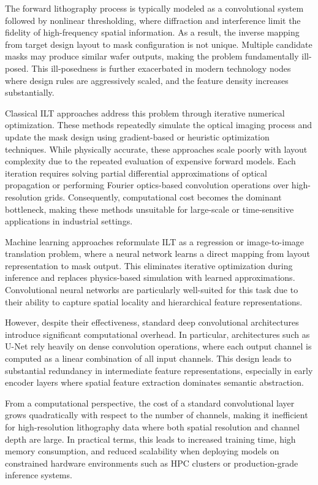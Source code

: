 \documentclass[conference]{IEEEtran}
\begin{document}
The forward lithography process is typically modeled as a convolutional system followed by nonlinear thresholding, where diffraction and interference limit the fidelity of high-frequency spatial information. As a result, the inverse mapping from target design layout to mask configuration is not unique. Multiple candidate masks may produce similar wafer outputs, making the problem fundamentally ill-posed. This ill-posedness is further exacerbated in modern technology nodes where design rules are aggressively scaled, and the feature density increases substantially.

Classical ILT approaches address this problem through iterative numerical optimization. These methods repeatedly simulate the optical imaging process and update the mask design using gradient-based or heuristic optimization techniques. While physically accurate, these approaches scale poorly with layout complexity due to the repeated evaluation of expensive forward models. Each iteration requires solving partial differential approximations of optical propagation or performing Fourier optics-based convolution operations over high-resolution grids. Consequently, computational cost becomes the dominant bottleneck, making these methods unsuitable for large-scale or time-sensitive applications in industrial settings.

Machine learning approaches reformulate ILT as a regression or image-to-image translation problem, where a neural network learns a direct mapping from layout representation to mask output. This eliminates iterative optimization during inference and replaces physics-based simulation with learned approximations. Convolutional neural networks are particularly well-suited for this task due to their ability to capture spatial locality and hierarchical feature representations.

However, despite their effectiveness, standard deep convolutional architectures introduce significant computational overhead. In particular, architectures such as U-Net rely heavily on dense convolution operations, where each output channel is computed as a linear combination of all input channels. This design leads to substantial redundancy in intermediate feature representations, especially in early encoder layers where spatial feature extraction dominates semantic abstraction.

From a computational perspective, the cost of a standard convolutional layer grows quadratically with respect to the number of channels, making it inefficient for high-resolution lithography data where both spatial resolution and channel depth are large. In practical terms, this leads to increased training time, high memory consumption, and reduced scalability when deploying models on constrained hardware environments such as HPC clusters or production-grade inference systems.
\end{document}
